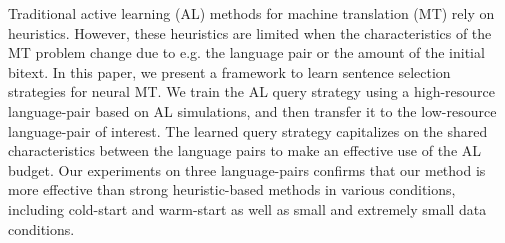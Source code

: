 Traditional active learning  (AL) methods for machine translation (MT) rely on heuristics. However, these heuristics are limited when the characteristics of the MT problem change due to e.g. the language pair or the amount of the initial bitext. In this paper, we present a framework to learn sentence selection strategies for neural MT. We train the AL query strategy using a high-resource language-pair based on AL simulations, and then transfer it to the low-resource language-pair of interest. The learned query strategy capitalizes on the shared characteristics between the language pairs to make an effective use of the AL budget. Our experiments on three language-pairs confirms that our method is more effective than strong heuristic-based methods in various conditions, including cold-start and warm-start as well as small and extremely small data conditions.
